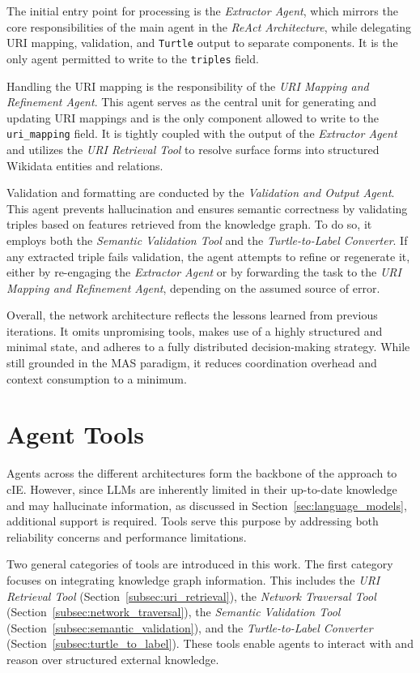 \documentclass[a4paper,oneside,bibliography=totoc]{scrbook}
\begin{document}
The initial entry point for processing is the \textit{Extractor Agent}, which mirrors the core responsibilities of the main agent in the \textit{ReAct Architecture}, while delegating URI mapping, validation, and \texttt{Turtle} output to separate components. It is the only agent permitted to write to the \texttt{triples} field.

Handling the URI mapping is the responsibility of the \textit{URI Mapping and Refinement Agent}. This agent serves as the central unit for generating and updating URI mappings and is the only component allowed to write to the \texttt{uri\_mapping} field. It is tightly coupled with the output of the \textit{Extractor Agent} and utilizes the \textit{URI Retrieval Tool} to resolve surface forms into structured Wikidata entities and relations.

Validation and formatting are conducted by the \textit{Validation and Output Agent}. This agent prevents hallucination and ensures semantic correctness by validating triples based on features retrieved from the knowledge graph. To do so, it employs both the \textit{Semantic Validation Tool} and the \textit{Turtle-to-Label Converter}. If any extracted triple fails validation, the agent attempts to refine or regenerate it, either by re-engaging the \textit{Extractor Agent} or by forwarding the task to the \textit{URI Mapping and Refinement Agent}, depending on the assumed source of error.

Overall, the network architecture reflects the lessons learned from previous iterations. It omits unpromising tools, makes use of a highly structured and minimal state, and adheres to a fully distributed decision-making strategy. While still grounded in the \ac{MAS} paradigm, it reduces coordination overhead and context consumption to a minimum.

\section{Agent Tools}
\label{sec:agent_tools}

Agents across the different architectures form the backbone of the approach to \ac{cIE}. However, since \acp{LLM} are inherently limited in their up-to-date knowledge and may hallucinate information, as discussed in Section~\ref{sec:language_models}, additional support is required. Tools serve this purpose by addressing both reliability concerns and performance limitations.

Two general categories of tools are introduced in this work. The first category focuses on integrating knowledge graph information. This includes the \textit{URI Retrieval Tool} (Section~\ref{subsec:uri_retrieval}), the \textit{Network Traversal Tool} (Section~\ref{subsec:network_traversal}), the \textit{Semantic Validation Tool} (Section~\ref{subsec:semantic_validation}), and the \textit{Turtle-to-Label Converter} (Section~\ref{subsec:turtle_to_label}). These tools enable agents to interact with and reason over structured external knowledge.
\end{document}

